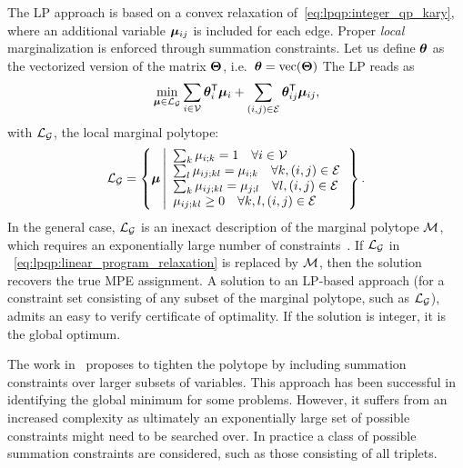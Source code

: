 The \ac{LP} approach \parencite{Schlesinger1976,Wainwright2008} is
based on a convex relaxation of~\eqref{eq:lpqp:integer_qp_kary}, where an
additional variable $\bm{\mu}_{ij}$ is included for each edge.
Proper \emph{local} marginalization is enforced through summation constraints.
Let us define $\bm{\theta}$ as the vectorized version of the matrix
$\bm{\Theta}$, i.e.\ $\bm{\theta} = \mathrm{vec}(\bm{\Theta})$
The \ac{LP} reads as
\begin{equation}
    \min_{\bm{\mu}\in\mathcal{L}_{\mathcal{G}}} \sum_{i\in\mathcal{V}}
    \bm{\theta}_{i}^{\mathsf{T}}\bm{\mu}_{i} 
    + \sum_{(i,j) \in \mathcal{E}} \bm{\theta}_{ij}^{\mathsf{T}}
    \bm{\mu}_{ij},
    \label{eq:lpqp:linear_program_relaxation}
\end{equation}
with $\mathcal{L}_{\mathcal{G}}$, the local marginal polytope:
\[
    \mathcal{L}_{\mathcal{G}} = \left \{ \bm{\mu} \left |
    \begin{array}{l}
        \sum_{k} \mu_{i;k} = 1 \quad \forall i \in \mathcal{V}\\
        \sum_{l} \mu_{ij;kl} = \mu_{i;k} \quad \forall k,
        (i,j)\in\mathcal{E}\\
        \sum_{k} \mu_{ij;kl} = \mu_{j;l} \quad \forall l,
        (i,j)\in\mathcal{E}\\
        \mu_{ij;kl} \geq 0 \quad \forall k,l,(i,j)\in\mathcal{E}\\
    \end{array} \right .
    \right \}.
\]
In the general case, $\mathcal{L}_{\mathcal{G}}$ is an inexact description of the
marginal polytope $\mathcal{M}$, which requires an exponentially large number of
constraints~\parencite{Wainwright2008}. If $\mathcal{L}_{\mathcal{G}}$ in
~\eqref{eq:lpqp:linear_program_relaxation} is replaced by
$\mathcal{M}$, then the solution recovers the true \ac{MPE}
assignment. 
A solution to an \ac{LP}-based approach (for a constraint set consisting of any subset of the marginal
polytope, such as $\mathcal{L}_{\mathcal{G}}$), admits an easy to verify certificate of optimality.
If the solution is integer, it is the global optimum.

The work in~\parencite{Sontag2008} proposes to tighten the polytope by including
summation constraints over larger subsets of variables. This approach has been
successful in identifying the global minimum for some problems.
However, it suffers from an increased complexity as
ultimately an exponentially large set of possible constraints might need to be
searched over. In practice a class of possible summation constraints are
considered, such as those consisting of all triplets.

